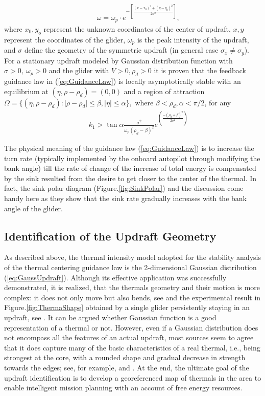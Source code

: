 \documentclass{ifacconf}
\begin{document}
\begin{eqnarray}
    && \omega=\omega_p \cdot e^{-[\frac{(x-x_0)^2+(y-y_0)^2}{2\sigma^2}]},
    \label{eq:GaussUpdraft}
\end{eqnarray}
where $x_0, y_o$ represent the unknown coordinates of the center of updraft,
$x, y$ represent the coordinates of the glider, $\omega_p$ is the peak intensity of the updraft,
and $\sigma$ define the geometry of the symmetric updraft (in general case $\sigma_x \neq \sigma_y$). For a stationary updraft modeled by Gaussian distribution function with $\sigma>0,~\omega_p>0$ and the glider with $V>0, \rho_d>0$ it is proven that the feedback guidance law in (\ref{eq:GuidanceLaw}) is locally asymptotically stable with an equilibrium at $(\eta, \rho-\rho_d)=(0,0)$ and a region of attraction $\Omega=\{(\eta, \rho-\rho_d): \vert \rho-\rho_d \vert \leq \beta,  \vert \eta \vert \leq \alpha \}, $ where $\beta < \rho_d, \alpha< \pi/2$, for any
\begin{eqnarray}
    && k_1 > \tan \alpha \frac{\sigma^2}{\omega_p(\rho_d-\beta)^2} e^(\frac{-(\rho_d+\beta)^2}{2\sigma^2} )\nonumber
    \label{eq:GuidanceGain}
\end{eqnarray}

The physical meaning of the guidance law (\ref{eq:GuidanceLaw}) is to increase the turn rate (typically implemented by the onboard autopilot through modifying the bank angle) till the rate of change of the increase of total energy is compensated by the sink resulted from the desire to get closer to the center of the thermal. In fact, the sink polar diagram (Figure.\ref{fig:SinkPolar}) and the discussion come handy here as they show that the sink rate gradually increases with the bank angle of the glider.

\subsection{Identification of the Updraft Geometry}
\label{subsec:UpdraftID}
As described above, the thermal intensity model adopted for the stability analysis of the thermal centering guidance law is the 2-dimensional Gaussian distribution (\ref{eq:GaussUpdraft}). Although its effective application was successfully demonstrated, it is realized, that the thermals geometry and their motion is more complex: it does not only move but also bends, see \cite{Reichmann:1978} and the experimental result in  Figure.\ref{fig:ThermaShape} obtained by a single glider persistently staying in an updraft, see \cite{AKlass_JGCD:2012}.  It can be argued whether Gaussian function is a good representation of a thermal or not. However, even if a Gaussian distribution does not encompass all the features of an actual updraft, most sources seem to agree that it does capture many of the basic characteristics of a real thermal, i.e., being strongest at the core, with a rounded shape and gradual decrease in strength towards the edges; see, for example, \cite{Wharington:1998} and \cite{Pagen:1992}. At the end, the ultimate goal of the updraft identification is to develop a georeferenced map of thermals in the area to enable intelligent mission planning with an account of free energy resources.
\end{document}
